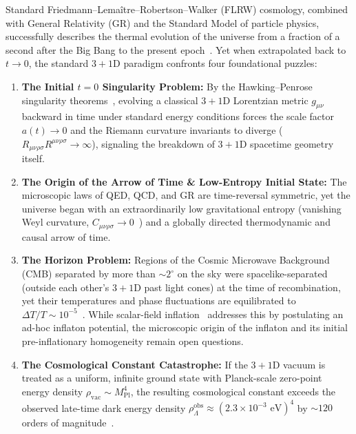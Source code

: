 \documentclass[11pt,a4paper]{article}
\begin{document}
Standard Friedmann--Lema\^itre--Robertson--Walker (FLRW) cosmology, combined with General Relativity (GR) and the Standard Model of particle physics, successfully describes the thermal evolution of the universe from a fraction of a second after the Big Bang to the present epoch~\cite{WeinbergCosmology2008}. Yet when extrapolated back to $t \to 0$, the standard $3+1\text{D}$ paradigm confronts four foundational puzzles:
\begin{enumerate}
    \item \textbf{The Initial $t = 0$ Singularity Problem:} By the Hawking--Penrose singularity theorems~\cite{HawkingPenrose1970}, evolving a classical $3+1\text{D}$ Lorentzian metric $g_{\mu\nu}$ backward in time under standard energy conditions forces the scale factor $a(t) \to 0$ and the Riemann curvature invariants to diverge ($R_{\mu\nu\rho\sigma}R^{\mu\nu\rho\sigma} \to \infty$), signaling the breakdown of $3+1\text{D}$ spacetime geometry itself.
    \item \textbf{The Origin of the Arrow of Time \& Low-Entropy Initial State:} The microscopic laws of QED, QCD, and GR are time-reversal symmetric, yet the universe began with an extraordinarily low gravitational entropy (vanishing Weyl curvature, $C_{\mu\nu\rho\sigma} \to 0$~\cite{PenroseCycles2010}) and a globally directed thermodynamic and causal arrow of time.
    \item \textbf{The Horizon Problem:} Regions of the Cosmic Microwave Background (CMB) separated by more than $\sim 2^\circ$ on the sky were spacelike-separated (outside each other's $3+1\text{D}$ past light cones) at the time of recombination, yet their temperatures and phase fluctuations are equilibrated to $\Delta T / T \sim 10^{-5}$~\cite{Planck2018}. While scalar-field inflation~\cite{Guth1981,Linde1982} addresses this by postulating an ad-hoc inflaton potential, the microscopic origin of the inflaton and its initial pre-inflationary homogeneity remain open questions.
    \item \textbf{The Cosmological Constant Catastrophe:} If the $3+1\text{D}$ vacuum is treated as a uniform, infinite ground state with Planck-scale zero-point energy density $\rho_{\text{vac}} \sim M_{\text{Pl}}^4$, the resulting cosmological constant exceeds the observed late-time dark energy density $\rho_\Lambda^{\text{obs}} \approx (2.3 \times 10^{-3}\text{ eV})^4$ by $\sim 120$ orders of magnitude~\cite{Weinberg1989,Volovik2003}.
\end{enumerate}
\end{document}
